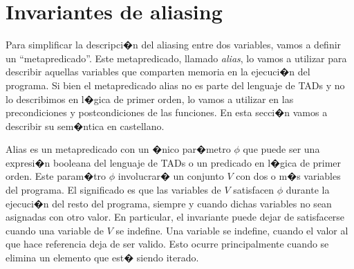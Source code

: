 \documentclass[a4paper,10pt]{article}
\begin{document}
\begin{tad}{}
  \tadAxiomas
\end{tad}

\section{Invariantes de aliasing}

Para simplificar la descripci�n del aliasing entre dos variables, vamos a definir un ``metapredicado''.  Este metapredicado, llamado \emph{alias}, lo vamos a utilizar para describir aquellas variables que comparten memoria en la ejecuci�n del programa.  Si bien el metapredicado alias no es parte del lenguaje de TADs y no lo describimos en l�gica de primer orden, lo vamos a utilizar en las precondiciones y postcondiciones de las funciones.  En esta secci�n vamos a describir su sem�ntica en castellano.

Alias es un metapredicado con un �nico par�metro $\phi$ que puede ser una expresi�n booleana del lenguaje de TADs o un predicado en l�gica de primer orden.  Este param�tro $\phi$ involucrar� un conjunto $V$ con dos o m�s variables del programa.  El significado es que las variables de $V$ satisfacen $\phi$ durante la ejecuci�n del resto del programa, siempre y cuando dichas variables no sean asignadas con otro valor.  En particular, el invariante puede dejar de satisfacerse cuando una variable de $V$ se indefine.  Una variable se indefine, cuando el valor al que hace referencia deja de ser valido.  Esto ocurre principalmente cuando se elimina un elemento que est� siendo iterado.
\end{document}
